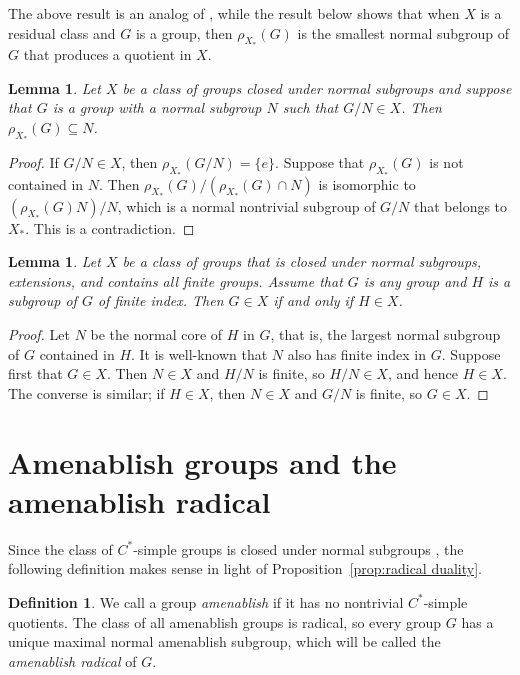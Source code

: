 \documentclass[a4paper]{amsart}
\theoremstyle{plain}
\newtheorem{lemma}[theorem]{Lemma}
\theoremstyle{definition}
\newtheorem{definition}[theorem]{Definition}
\theoremstyle{remark}
\numberwithin{theorem}{section}
\begin{document}
The above result is an analog of \cite[Theorem~1.4]{BKKO},
while the result below shows that when $X$ is a residual class and $G$ is a group,
then $\rho_{X_*}(G)$ is the smallest normal subgroup of $G$ that produces a quotient in $X$.

\begin{lemma}
Let $X$ be a class of groups closed under normal subgroups
and suppose that $G$ is a group with a normal subgroup $N$ such that $G/N\in X$.
Then $\rho_{X_*}(G)\subseteq N$.
\end{lemma}

\begin{proof}
If $G/N\in X$, then $\rho_{X_*}(G/N)=\{e\}$.
Suppose that $\rho_{X_*}(G)$ is not contained in $N$.
Then $\rho_{X_*}(G)/(\rho_{X_*}(G)\cap N)$ is isomorphic to $(\rho_{X_*}(G)N)/N$,
which is a normal nontrivial subgroup of $G/N$ that belongs to $X_*$.
This is a contradiction.
\end{proof}

\begin{lemma}\label{lem:finite-index}
Let $X$ be a class of groups that is closed under normal subgroups, extensions, and contains all finite groups.
Assume that $G$ is any group and $H$ is a subgroup of $G$ of finite index.
Then $G\in X$ if and only if $H\in X$.
\end{lemma}

\begin{proof}
Let $N$ be the normal core of $H$ in $G$, that is, the largest normal subgroup of $G$ contained in $H$.
It is well-known that $N$ also has finite index in $G$.
Suppose first that $G\in X$.
Then $N\in X$ and $H/N$ is finite, so $H/N\in X$, and hence $H\in X$.
The converse is similar;
if $H\in X$, then $N\in X$ and $G/N$ is finite, so $G\in X$.
\end{proof}


\section{Amenablish groups and the amenablish radical}\label{sec:aish}

Since the class of $C^*$-simple groups is closed under normal subgroups \cite[Theorem~1.4]{BKKO},
the following definition makes sense in light of Proposition~\ref{prop:radical duality}.

\begin{definition}
We call a group \emph{amenablish} if it has no nontrivial $C^*$-simple quotients.
The class of all amenablish groups is radical,
so every group $G$ has a unique maximal normal amenablish subgroup,
which will be called the \emph{amenablish radical} of $G$.
\end{definition}
\end{document}
